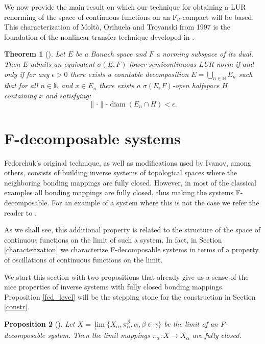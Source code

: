 \documentclass[11pt]{article}
\newcommand{\N}{\mathbb{N}}
\DeclareMathOperator{\diam}{diam}
\newtheorem{theorem}{Theorem}[section]
\newtheorem{proposition}[theorem]{Proposition}
\theoremstyle{definition}
\theoremstyle{remark}
\begin{document}
We now provide the main result on which our technique for obtaining a LUR renorming of the space of continuous functions on an $\mathrm{F}_d$-compact will be based. This characterization of Molt\`o, Orihuela and Troyanski from 1997 is the foundation of the nonlinear transfer technique developed in \cite{motv}.

\begin{theorem}[\cite{mot97}]\label{LUR_char}
	Let $E$ be a Banach space and $F$ a norming subspace of its dual. Then $E$ admits an equivalent $\sigma(E,F)$-lower semicontinuous LUR norm if and only if for any $\epsilon >0$ there exists a countable decomposition $E = \bigcup_{n \in \N} E_n$ such that for all $n \in \N$ and $x \in E_n$ there exists a $\sigma(E,F)$-open halfspace $H$ containing $x$ and satisfying:
	\begin{equation*}
		\|\cdot\| \text{-} \diam \left(E_n \cap H \right) < \epsilon.
	\end{equation*}
\end{theorem}


\section{F-decomposable systems}

Fedorchuk's original technique, as well as modifications used by Ivanov, among others, consists of building inverse systems of topological spaces where the neighboring bonding mappings are fully closed. However, in most of the classical examples all bonding mappings are fully closed, thus making the systems F-decomposable. For an example of a system where this is not the case we refer the reader to \cite{ivanov_qfc}.

As we shall see, this additional property is related to the structure of the space of continuous functions on the limit of such a system. In fact, in Section \ref{characterization} we characterize F-decomposable systems in terms of a property of oscillations of continuous functions on the limit.

We start this section with two propositions that already give us a sense of the nice properties of inverse systems with fully closed bonding mappings. Proposition \ref{fed_level} will be the stepping stone for the construction in Section \ref{constr}.

\begin{proposition} [{\cite[II.3.1]{fedFC}}] \label{fc_limit}
	Let $X = \lim\limits_{\leftarrow}\{X_\alpha, \pi_\alpha^\beta, \alpha, \beta \in \gamma\}$ be the limit of an F-decomposable system. Then the limit mappings $\pi_\alpha: X \to X_\alpha$ are fully closed.
\end{proposition}
\end{document}
